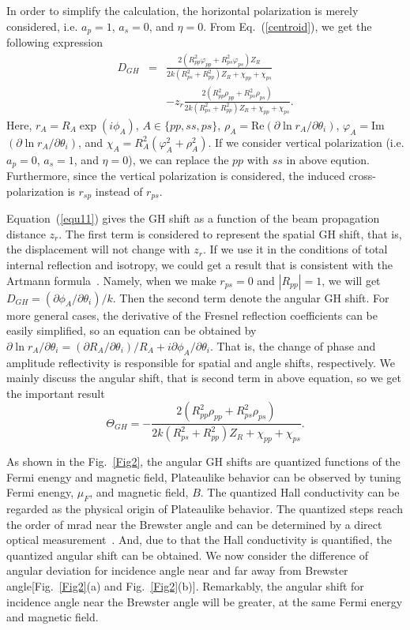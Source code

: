 \documentclass[twocolumn,showpacs,preprintnumbers,amsmath,amssymb]{revtex4}
\begin{document}
In order to simplify the calculation,
the horizontal polarization is merely considered,
i.e. $a_{p}=1$, $a_{s}=0$, and $\eta=0$.
From  Eq.~(\ref{centroid}), we get the following expression
\begin{eqnarray}
  D_{GH} &=& \frac{2(R_{pp}^2\varphi_{pp}+R_{ps}^2\varphi_{ps})Z_{R}}{2k(R_{ps}^2+R_{pp}^2)Z_{R}+\chi_{pp}+\chi_{ps}} \nonumber\\
  &&-z_r\frac{2(R_{pp}^2\rho_{pp}+R_{ps}^2\rho_{ps})}{2k(R_{ps}^2+R_{pp}^2)Z_{R}+\chi_{pp}+\chi_{ps}}.\label{equ11}
\end{eqnarray}
Here, $r_A=R_{A}\exp(i\phi_A)$, $A\in\{pp,ss,ps\}$,
$\rho_{A}=$Re$(\partial\ln r_{A}/\partial\theta_{i})$,
$\varphi_{A}=$Im$(\partial\ln r_{A}/\partial\theta_{i})$, and $\chi_{A}=R_{A}^2(\varphi_{A}^2+\rho_{A}^2)$.
If we consider vertical polarization (i.e. $a_{p}=0$, $a_{s}=1$, and $\eta=0$),
we can replace the $pp$ with $ss$ in above eqution.
Furthermore, since the vertical polarization is considered,
the induced cross-polarization is $r_{sp}$ instead of $r_{ps}$.

Equation~(\ref{equ11}) gives the GH shift as a function of the beam propagation distance $z_r$.
The first term is considered to represent the spatial GH shift,
that is, the displacement will not change with $z_r$. If we use it in the conditions of total
internal reflection and isotropy, we could get a result that is consistent with the Artmann formula~\cite{Artmann1948}. Namely,
when we make $r_{ps}=0$ and $|R_{pp}|=1$, we will get $D_{GH}=(\partial\phi_{A}/\partial\theta_{i})/k$.
Then the second term denote the angular GH shift. For more general cases,
the derivative of the Fresnel reflection coefficients can be easily simplified,
so an equation can be obtained by $\partial\ln r_{A}/\partial\theta_{i}=(\partial R_{A}/\partial\theta_{i})/R_{A}+i\partial\phi_{A}/\partial\theta_{i}$.
That is, the change of phase and amplitude reflectivity is responsible for spatial and angle shifts, respectively.
We mainly discuss the angular shift, that is second term in above equation,
so we get the important result
\begin{equation}\label{equ12}
  \Theta_{GH} =-\frac{2(R_{pp}^2\rho_{pp}+R_{ps}^2\rho_{ps})}{2k(R_{ps}^2+R_{pp}^2)Z_{R}+\chi_{pp}+\chi_{ps}}.
\end{equation}

As shown in the Fig.~\ref{Fig2},
the angular GH shifts are quantized functions of the Fermi enengy and magnetic field,
Plateaulike behavior can be observed by tuning Fermi enengy, $\mu_{F}$, and magnetic field, $B$.
The quantized Hall conductivity can be regarded as the physical origin of Plateaulike behavior.
The quantized steps reach the order of mrad near the Brewster angle and can be determined
by a direct optical measurement~\cite{Santana2016}.
And, due to that the Hall conductivity is quantified, the quantized angular shift can be obtained.
We now consider the difference of angular deviation for incidence angle near and far away from Brewster angle[Fig.~\ref{Fig2}(a) and Fig.~\ref{Fig2}(b)].
Remarkably, the angular shift for incidence angle near the Brewster angle will be greater,
at the same Fermi energy and magnetic field.
\end{document}
